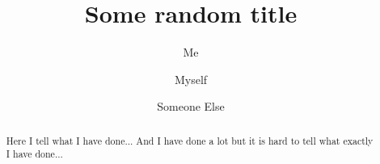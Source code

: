 \documentclass[aps,prl,reprint]{revtex4-1}
\begin{document}
\title{Some random title}
\author{Me}
\author{Myself}
\author{Someone Else}

\begin{abstract}
Here I tell what I have done... And I have done a lot but it is hard to tell what exactly I have done...
\end{abstract}

\maketitle

%
\end{document}
